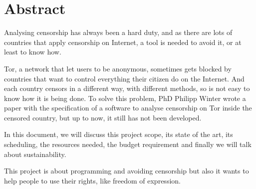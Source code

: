 \section{Abstract}
Analysing censorship has always been a hard duty, and as there are lots of countries that apply censorship on Internet, a tool is needed to avoid it, or at least to know how.

Tor, a network that let users to be anonymous, sometimes gets blocked by countries that want to control everything their citizen do on the Internet. And each country censors in a different way, with different methods, so is not easy to know how it is being done. 
To solve this problem, PhD Philipp Winter wrote a paper with the specification of a software to analyse censorship on Tor inside the censored country, but up to now, it still has not been developed.

In this document, we will discuss this project scope, its state of the art, its scheduling, the resources needed, the budget requirement and finally we will talk about sustainability.

This project is about programming and avoiding censorship but also it wants to help people to use their rights, like freedom of expression.